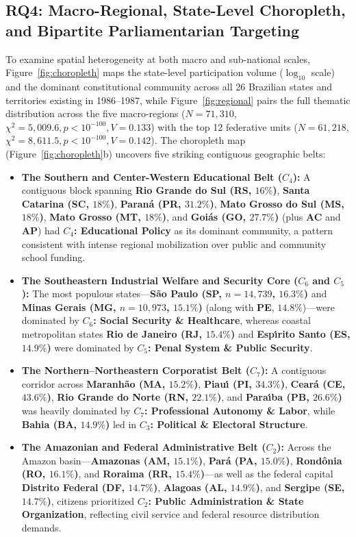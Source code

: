 \documentclass[pdflatex,sn-basic]{sn-jnl}
\begin{document}
\subsection{RQ4: Macro-Regional, State-Level Choropleth, and Bipartite Parliamentarian Targeting}
To examine spatial heterogeneity at both macro and sub-national scales, Figure~\ref{fig:choropleth} maps the state-level participation volume ($\log_{10}$ scale) and the dominant constitutional community across all 26 Brazilian states and territories existing in 1986--1987, while Figure~\ref{fig:regional} pairs the full thematic distribution across the five macro-regions ($N=71,310$, $\chi^2 = 5,009.6, p < 10^{-100}, V = 0.133$) with the top 12 federative units ($N=61,218$, $\chi^2 = 8,611.5, p < 10^{-100}, V = 0.142$). The choropleth map (Figure~\ref{fig:choropleth}b) uncovers five striking contiguous geographic belts:
\begin{itemize}
    \item \textbf{The Southern and Center-Western Educational Belt ($C_4$):} A contiguous block spanning \textbf{Rio Grande do Sul (RS, $16\%$)}, \textbf{Santa Catarina (SC, $18\%$)}, \textbf{Paran\'{a} (PR, $31.2\%$)}, \textbf{Mato Grosso do Sul (MS, $18\%$)}, \textbf{Mato Grosso (MT, $18\%$)}, and \textbf{Goi\'{a}s (GO, $27.7\%$)} (plus \textbf{AC} and \textbf{AP}) had \textbf{$C_4$: Educational Policy} as its dominant community, a pattern consistent with intense regional mobilization over public and community school funding.
    \item \textbf{The Southeastern Industrial Welfare and Security Core ($C_6$ and $C_5$):} The most populous states---\textbf{S\~{a}o Paulo (SP, $n=14,739$, $16.3\%$)} and \textbf{Minas Gerais (MG, $n=10,973$, $15.1\%$)} (along with \textbf{PE}, $14.8\%$)---were dominated by \textbf{$C_6$: Social Security \& Healthcare}, whereas coastal metropolitan states \textbf{Rio de Janeiro (RJ, $15.4\%$)} and \textbf{Esp\'{\i}rito Santo (ES, $14.9\%$)} were dominated by \textbf{$C_5$: Penal System \& Public Security}.
    \item \textbf{The Northern--Northeastern Corporatist Belt ($C_7$):} A contiguous corridor across \textbf{Maranh\~{a}o (MA, $15.2\%$)}, \textbf{Piau\'{\i} (PI, $34.3\%$)}, \textbf{Cear\'{a} (CE, $43.6\%$)}, \textbf{Rio Grande do Norte (RN, $22.1\%$)}, and \textbf{Para\'{\i}ba (PB, $26.6\%$)} was heavily dominated by \textbf{$C_7$: Professional Autonomy \& Labor}, while \textbf{Bahia (BA, $14.9\%$)} led in \textbf{$C_3$: Political \& Electoral Structure}.
    \item \textbf{The Amazonian and Federal Administrative Belt ($C_2$):} Across the Amazon basin---\textbf{Amazonas (AM, $15.1\%$)}, \textbf{Par\'{a} (PA, $15.0\%$)}, \textbf{Rond\^{o}nia (RO, $16.1\%$)}, and \textbf{Roraima (RR, $15.4\%$)}---as well as the federal capital \textbf{Distrito Federal (DF, $14.7\%$)}, \textbf{Alagoas (AL, $14.9\%$)}, and \textbf{Sergipe (SE, $14.7\%$)}, citizens prioritized \textbf{$C_2$: Public Administration \& State Organization}, reflecting civil service and federal resource distribution demands.
\end{itemize}
\end{document}
